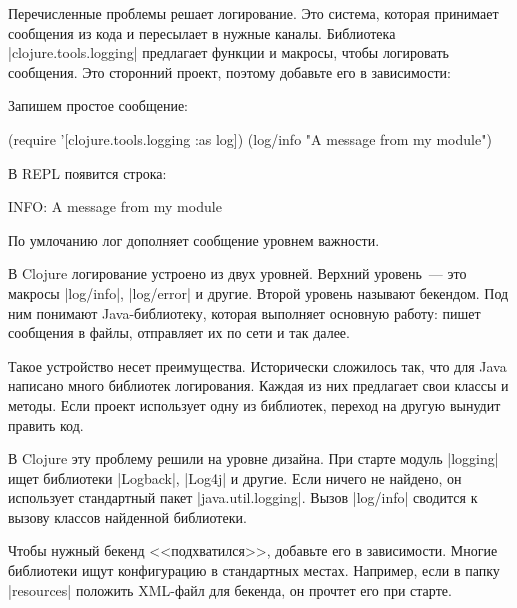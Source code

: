 Перечисленные проблемы решает логирование. Это система, которая принимает
сообщения из кода и пересылает в нужные каналы. Библиотека
\spverb|clojure.tools.logging| предлагает функции и макросы, чтобы логировать
сообщения. Это сторонний проект, поэтому добавьте его в зависимости:

\begin{english}
  \begin{clojure}
  \end{clojure}
\end{english}

\noindent
Запишем простое сообщение:

\begin{english}
  \begin{clojure}
(require '[clojure.tools.logging :as log])
(log/info "A message from my module")
  \end{clojure}
\end{english}

В REPL появится строка:

\begin{english}
  \begin{text}
INFO: A message from my module
  \end{text}
\end{english}

\noindent
По умлочанию лог дополняет сообщение уровнем важности.

В Clojure логирование устроено из двух уровней. Верхний уровень~--- это макросы
\spverb|log/info|, \spverb|log/error| и другие. Второй уровень называют
бекендом. Под ним понимают Java-библиотеку, которая выполняет основную работу:
пишет сообщения в файлы, отправляет их по сети и так далее.

Такое устройство несет преимущества. Исторически сложилось так, что для Java
написано много библиотек логирования. Каждая из них предлагает свои классы и
методы. Если проект использует одну из библиотек, переход на другую вынудит
править код.

В Clojure эту проблему решили на уровне дизайна. При старте модуль
\spverb|logging| ищет библиотеки \spverb|Logback|, \spverb|Log4j| и другие. Если
ничего не найдено, он использует стандартный пакет
\spverb|java.util.logging|. Вызов \spverb|log/info| сводится к вызову классов
найденной библиотеки.

Чтобы нужный бекенд <<подхватился>>, добавьте его в зависимости. Многие
библиотеки ищут конфигурацию в стандартных местах. Например, если в папку
\spverb|resources| положить XML-файл для бекенда, он прочтет его при старте.

